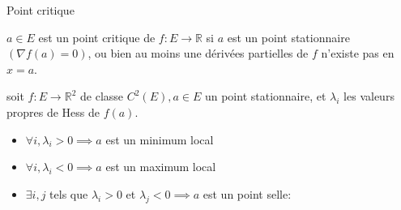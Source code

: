        \begin{parag}{Point critique}
           \begin{definition}
            $a \in E$ est un point critique de $f : E \to \mathbb{R}$ si $a$ est un point stationnaire $\left( \nabla f\left(a\right) = 0\right)$, ou bien au moins une dérivées partielles de $f$ n'existe pas en $x = a$.
           \end{definition}
           \begin{theoreme}
           soit $f: E \to \mathbb{R}^2$ de classe $C^2\left(E\right), a \in E$ un point stationnaire, et $\lambda_i$ les valeurs propres de Hess de $f\left(a\right)$.
           \begin{itemize}
               \item $\forall i, \lambda_i > 0 \implies a$ est un minimum local
               \item $\forall i , \lambda_i < 0 \implies a$ est un maximum local
               \item $\exists i , j$ tels que $\lambda_i > 0$ et $\lambda_j < 0 \implies a$ est un point selle:
               
           \end{itemize}
           
           \end{theoreme}
           
       \end{parag}
       

